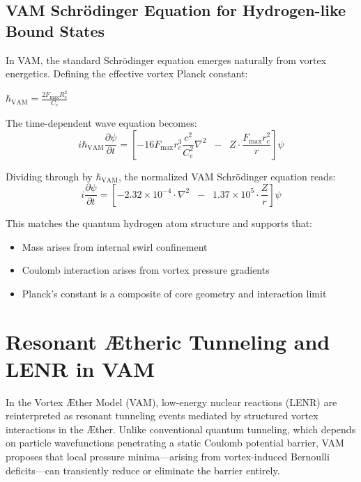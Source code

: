 \subsection*{ VAM Schrödinger Equation for Hydrogen-like Bound States}

In VAM, the standard Schrödinger equation emerges naturally from vortex energetics. Defining the effective vortex Planck constant:

$ \hbar_{\text{VAM}} = \frac{2 F_{\max} R_e^2}{C_e} $

The time-dependent wave equation becomes:
\begin{equation}
    i \hbar_{\text{VAM}} \frac{\partial \psi}{\partial t} =
\left[
    -16 F_{\max} r_c^3 \frac{c^2}{C_e^2} \nabla^2
    \;\;-\;\;
    Z \cdot \frac{F_{\max} r_c^2}{r}
\right] \psi
\end{equation}


Dividing through by $\hbar_{\text{VAM}}$, the normalized VAM Schrödinger equation reads:
\begin{equation}
    i \frac{\partial \psi}{\partial t} =
\left[
    -2.32 \times 10^{-4} \cdot \nabla^2
    \;\;-\;\;
    1.37 \times 10^5 \cdot \frac{Z}{r}
\right] \psi
\end{equation}


This matches the quantum hydrogen atom structure and supports that:


\begin{itemize}
\item Mass arises from internal swirl confinement
\item Coulomb interaction arises from vortex pressure gradients
\item Planck’s constant is a composite of core geometry and interaction limit
\end{itemize}


\section*{Resonant Ætheric Tunneling and LENR in VAM}

In the Vortex Æther Model (VAM), low-energy nuclear reactions (LENR) are reinterpreted as resonant tunneling events mediated by structured vortex interactions in the Æther. Unlike conventional quantum tunneling, which depends on particle wavefunctions penetrating a static Coulomb potential barrier, VAM proposes that local pressure minima---arising from vortex-induced Bernoulli deficits---can transiently reduce or eliminate the barrier entirely.


